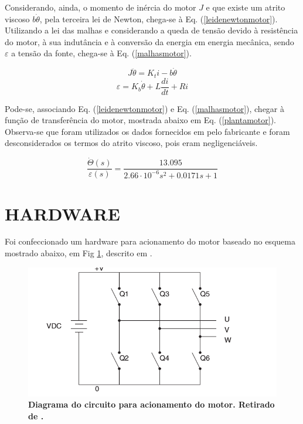 \documentclass[10pt,fleqn,a4paper]{article}
\begin{document}
    Considerando, ainda, o momento de inércia do motor $J$ e que existe um atrito viscoso $b\dot{\theta}$, pela terceira lei de Newton, chega-se à Eq. (\ref{leidenewtonmotor}). Utilizando a lei das malhas e considerando a queda de tensão devido à resistência do motor, à sua indutância e à conversão da energia em energia mecânica, sendo $\varepsilon$ a tensão da fonte, chega-se à Eq. (\ref{malhasmotor}).
    
    \begin{equation}
    J\ddot{\theta} = K_ti - b\dot{\theta} \label{leidenewtonmotor}
    \end{equation}
    \begin{equation}
    \varepsilon = K_b\dot{\theta} + L\frac{di}{dt} + Ri \label{malhasmotor}
    \end{equation}
    
    Pode-se, associando Eq. (\ref{leidenewtonmotor}) e Eq. (\ref{malhasmotor}), chegar à função de transferência do motor, mostrada abaixo em Eq. (\ref{plantamotor}). Observa-se que foram utilizados os dados fornecidos em \cite{Datasheet} pelo fabricante e foram desconsiderados os termos do atrito viscoso, pois eram negligenciáveis.
    
    \begin{equation}
    \frac{\dot{\Theta}(s)}{\varepsilon(s)} = \frac{13.095}{2.66 \cdot 10^{-6} s^2+0.0171s+1} \label{plantamotor}
    \end{equation}
    
    \section{HARDWARE}
    
    Foi confeccionado um hardware para acionamento do motor baseado no esquema mostrado abaixo, em Fig \ref{fig:diagrama}, descrito em \cite{atmeldiagrama}. 
    
	\begin{figure}[ht]
		\begin{center}
			\includegraphics[angle=0, scale=0.5]{images/circuitdiagram}
		\end{center}
		\caption{\textbf{Diagrama do circuito para acionamento do motor. Retirado de \cite{atmeldiagrama}.}}
		\label{fig:diagrama}
	\end{figure}
    
\end{document}
